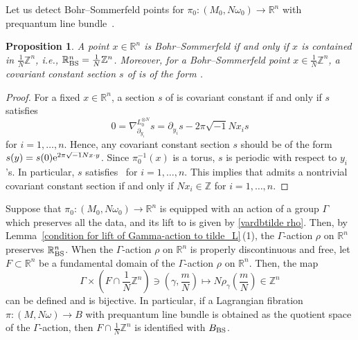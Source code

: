 \documentclass[10pt,a4paper]{amsart}
\numberwithin{equation}{section}
\newtheorem{Proposition}[Theorem]{Proposition}
 { \theoremstyle{definition}
\newtheorem{Definition}[Theorem]{Definition}
\newtheorem{Note}[Theorem]{Note}
\newtheorem{Example}[Theorem]{Example}
\newtheorem{Remark}[Theorem]{Remark} }
\newcommand{\R}{\mathbb{R}}
\newcommand{\Z}{\mathbb{Z}}
\renewcommand{\tilde}{\widetilde}
\newcommand{\vardbtilde}[1]{\tilde{\raisebox{0pt}[0.85\height]{$\tilde{#1}$}}}
\begin{document}
Let us detect Bohr--Sommerfeld points for $\pi_0\colon (M_0,N\omega_0)\to \R^n$ with prequantum line bundle~.
\begin{Proposition}\label{BS}
A point $x\in \R^n$ is Bohr--Sommerfeld if and only if $x$ is contained in $\frac{1}{N}\Z^n$, i.e., $\R^n_{\rm BS}=\frac{1}{N}\Z^n$. Moreover, for a Bohr--Sommerfeld point $x\in \frac{1}{N}\Z^n$, a covariant constant section $s$ of  is of the form .
\end{Proposition}
\begin{proof}
For a fixed $x\in \R^n$, a section $s$ of  is covariant constant if and only if $s$ satisfies
\[
0=\nabla^{L_0^{\otimes N}}_{\partial_{y_i}}s=\partial_{y_i}s-2\pi\sqrt{-1}Nx_is
\]
for $i=1,\ldots , n$. Hence, any covariant constant section $s$ should be of the form $s(y)=\smash{s(0){\rm e}^{2\pi\sqrt{-1}Nx\cdot y}}$. Since $\pi_0^{-1}(x)$ is a torus, $s$ is periodic with respect to $y_i$'s. In particular, $s$ satisfies~ for $i=1,\ldots , n$. This implies that  admits a nontrivial covariant constant section if and only if $Nx_i\in \Z$ for $i=1,\ldots , n$.
\end{proof}

\begin{Remark}\label{action preserves BS}
Suppose that $\pi_0\colon (M_0,N\omega_0)\to \R^n$ is equipped with an action of a group $\Gamma$ which preserves all the data, and its lift \smash{$\vardbtilde \rho$} to  is given by \eqref{vardbtilde rho}. Then, by Lemma~\ref{condition for lift of Gamma-action to tilde_L}\,(1), the $\Gamma$-action $\rho$ on $\R^n$ preserves $\R^n_{\rm BS}$. When the $\Gamma$-action $\rho$ on $\R^n$ is properly discontinuous and free, let $F\subset \R^n$ be a fundamental domain of the $\Gamma$-action $\rho$ on $\R^n$. Then, the map
\begin{equation}\label{Gamma times F}
\Gamma\times \left(F\cap \frac{1}{N}\Z^n\right)\ni \left(\gamma ,\dfrac{m}{N}\right)\mapsto N\rho_\gamma \left(\dfrac{m}{N}\right)\in \Z^n
\end{equation}
can be defined and is bijective. In particular, if a Lagrangian fibration $\pi\colon (M,N\omega)\to B$ with prequantum line bundle  is obtained as the quotient space of the $\Gamma$-action, then $F\cap \frac{1}{N}\Z^n$ is identified with $B_{\rm BS}$.
\end{Remark}
\end{document}
